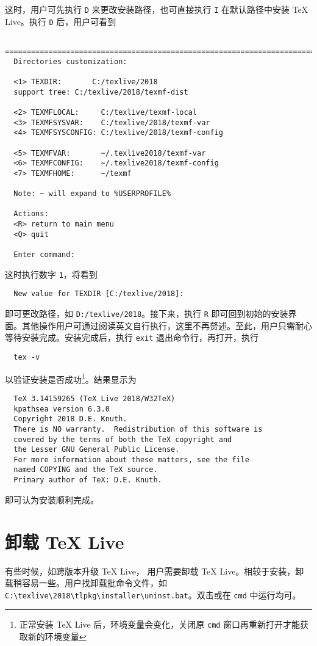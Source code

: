 \documentclass{ctexart}
\begin{document}
这时，用户可先执行 \texttt{D} 来更改安装路径，也可直接执行 \texttt{I} 在默认路径中安装 \TeX{} Live。执行 \texttt{D} 后，用户可看到
\begin{lstlisting}
  ==============================================================================
  Directories customization:
  
  <1> TEXDIR:       C:/texlive/2018
  support tree: C:/texlive/2018/texmf-dist
  
  <2> TEXMFLOCAL:     C:/texlive/texmf-local
  <3> TEXMFSYSVAR:    C:/texlive/2018/texmf-var
  <4> TEXMFSYSCONFIG: C:/texlive/2018/texmf-config
  
  <5> TEXMFVAR:       ~/.texlive2018/texmf-var
  <6> TEXMFCONFIG:    ~/.texlive2018/texmf-config
  <7> TEXMFHOME:      ~/texmf
  
  Note: ~ will expand to %USERPROFILE%
  
  Actions:
  <R> return to main menu
  <Q> quit
  
  Enter command:
\end{lstlisting}
这时执行数字 \texttt{1}，将看到
\begin{lstlisting}
  New value for TEXDIR [C:/texlive/2018]:
\end{lstlisting}
即可更改路径，如 \texttt{D:/texlive/2018}。接下来，执行 \texttt{R} 即可回到初始的安装界面。其他操作用户可通过阅读英文自行执行，这里不再赘述。至此，用户只需耐心等待安装完成。安装完成后，执行 \texttt{exit} 退出命令行，再打开，执行
\begin{lstlisting}
  tex -v
\end{lstlisting}
以验证安装是否成功\footnote{正常安装 \TeX{} Live 后，环境变量会变化，关闭原 \texttt{cmd} 窗口再重新打开才能获取新的环境变量}。结果显示为
\begin{lstlisting}
  TeX 3.14159265 (TeX Live 2018/W32TeX)
  kpathsea version 6.3.0
  Copyright 2018 D.E. Knuth.
  There is NO warranty.  Redistribution of this software is
  covered by the terms of both the TeX copyright and
  the Lesser GNU General Public License.
  For more information about these matters, see the file
  named COPYING and the TeX source.
  Primary author of TeX: D.E. Knuth.
\end{lstlisting}
即可认为安装顺利完成。

\section{卸载 \TeX{} Live}
有些时候，如跨版本升级 \TeX{} Live， 用户需要卸载 \TeX{} Live。相较于安装，卸载稍容易一些。用户找卸载批命令文件，如 \texttt{C:\textbackslash texlive\textbackslash 2018\textbackslash tlpkg\textbackslash installer\textbackslash uninst.bat}。双击或在 \texttt{cmd} 中运行均可。
\end{document}
